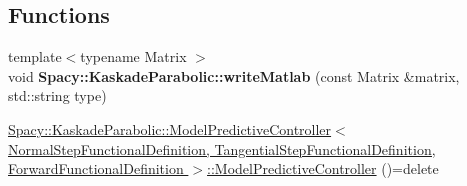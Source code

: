 \subsection*{Functions}
\begin{DoxyCompactItemize}
\item 
\hypertarget{group__KaskadeParabolicGroup_gae74d29175655fbcbf0c9acdf26301abc}{{\footnotesize template$<$typename Matrix $>$ }\\void {\bfseries Spacy\-::\-Kaskade\-Parabolic\-::write\-Matlab} (const Matrix \&matrix, std\-::string type)}\label{group__KaskadeParabolicGroup_gae74d29175655fbcbf0c9acdf26301abc}

\item 
\hypertarget{group__KaskadeParabolicGroup_gaf64fe59c15ac16711e93f3d354b14d7d}{\hyperlink{group__KaskadeParabolicGroup_gaf64fe59c15ac16711e93f3d354b14d7d}{Spacy\-::\-Kaskade\-Parabolic\-::\-Model\-Predictive\-Controller$<$ Normal\-Step\-Functional\-Definition, Tangential\-Step\-Functional\-Definition, Forward\-Functional\-Definition $>$\-::\-Model\-Predictive\-Controller} ()=delete}\label{group__KaskadeParabolicGroup_gaf64fe59c15ac16711e93f3d354b14d7d}


\end{DoxyCompactItemize}
